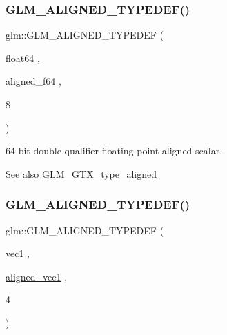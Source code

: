 \subsubsection{\texorpdfstring{G\+L\+M\+\_\+\+A\+L\+I\+G\+N\+E\+D\+\_\+\+T\+Y\+P\+E\+D\+E\+F()}{GLM\_ALIGNED\_TYPEDEF()}\hspace{0.1cm}{\footnotesize\ttfamily [142/209]}}
{\footnotesize\ttfamily glm\+::\+G\+L\+M\+\_\+\+A\+L\+I\+G\+N\+E\+D\+\_\+\+T\+Y\+P\+E\+D\+EF (\begin{DoxyParamCaption}\item[{\hyperlink{group__gtc__type__precision_gab721f828b41f46b20cf4883b50733d3b}{float64}}]{,  }\item[{aligned\+\_\+f64}]{,  }\item[{8}]{ }\end{DoxyParamCaption})}

64 bit double-\/qualifier floating-\/point aligned scalar. \begin{DoxySeeAlso}{See also}
\hyperlink{group__gtx__type__aligned}{G\+L\+M\+\_\+\+G\+T\+X\+\_\+type\+\_\+aligned} 
\end{DoxySeeAlso}
\mbox{\label{group__gtx__type__aligned_ga81bc497b2bfc6f80bab690c6ee28f0f9}} 
\subsubsection{\texorpdfstring{G\+L\+M\+\_\+\+A\+L\+I\+G\+N\+E\+D\+\_\+\+T\+Y\+P\+E\+D\+E\+F()}{GLM\_ALIGNED\_TYPEDEF()}\hspace{0.1cm}{\footnotesize\ttfamily [143/209]}}
{\footnotesize\ttfamily glm\+::\+G\+L\+M\+\_\+\+A\+L\+I\+G\+N\+E\+D\+\_\+\+T\+Y\+P\+E\+D\+EF (\begin{DoxyParamCaption}\item[{\hyperlink{group__ext__vec1_ga16030dae9029ed1eab1553a2183bbb79}{vec1}}]{,  }\item[{\hyperlink{group__gtc__type__aligned_ga8cf75c112dfa39264b7ef65c2ed6b3c4}{aligned\+\_\+vec1}}]{,  }\item[{4}]{ }\end{DoxyParamCaption})}

